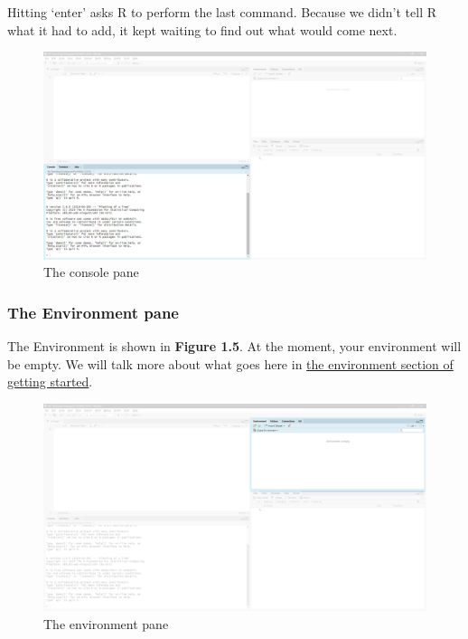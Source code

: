 \documentclass[
]{book}
\begin{document}
Hitting `enter' asks R to perform the last command. Because we didn't tell R what it had to add, it kept waiting to find out what would come next.

\begin{figure}

{\centering \includegraphics[width=24.81in]{images/02_install/rstud04} 

}

\caption{The console pane}\label{fig:unnamed-chunk-12}
\end{figure}

\hypertarget{the-environment-pane}{%
\subsubsection{The Environment pane}\label{the-environment-pane}}

The Environment is shown in \textbf{Figure 1.5}. At the moment, your environment will be empty. We will talk more about what goes here in \protect\hyperlink{environment}{the environment section of getting started}.

\begin{figure}

{\centering \includegraphics[width=24.81in]{images/02_install/rstud05} 

}

\caption{The environment pane}\label{fig:unnamed-chunk-13}
\end{figure}
\end{document}
